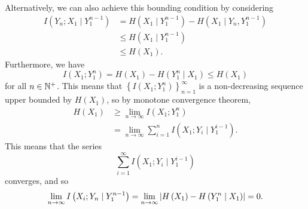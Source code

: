 \documentclass[math]{amznotes}
\theoremstyle{remark}
\begin{document}
Alternatively, we can also achieve this bounding condition by considering 
\begin{align*}
    I\left(Y_n ; X_1 \mid Y_1^{n - 1}\right) & = H\left(X_1 \mid Y_1^{n - 1}\right) - H\left(X_1 \mid Y_n, Y_1^{n - 1}\right) \\
    & \leq H\left(X_1 \mid Y_1^{n - 1}\right) \\
    & \leq H\left(X_1\right).
\end{align*}
Furthermore, we have 
\begin{equation*}
    I\left(X_1 ; Y_1^n\right) = H\left(X_1\right) - H\left(Y_1^n \mid X_1\right) \leq H\left(X_1\right)
\end{equation*}
for all $n \in \mathbb{N}^+$. This means that $\left\{I\left(X_1 ; Y_1^n\right)\right\}_{n = 1}^{\infty}$ is a non-decreasing sequence upper bounded by $H\left(X_1\right)$, so by monotone convergence theorem,
\begin{align*}
    H\left(X_1\right) & \geq \lim_{n \to \infty}I\left(X_1 ; Y_1^n\right) \\
    & = \lim_{n \to \infty}\sum_{i = 1}^{n}I\left(X_1 ; Y_i \mid Y_1^{i - 1}\right).
\end{align*}
This means that the series 
\begin{equation*}
    \sum_{i = 1}^{\infty}I\left(X_1 ; Y_i \mid Y_1^{i - 1}\right)
\end{equation*}
converges, and so 
\begin{equation*}
    \lim_{n \to \infty}I\left(X_i ; Y_n \mid Y_1^{n - 1}\right) = \lim_{n \to \infty}{\left\lvert {H\left(X_1\right) - H\left(Y_1^n \mid X_1\right)} \right\rvert} = 0.
\end{equation*}
\end{document}
